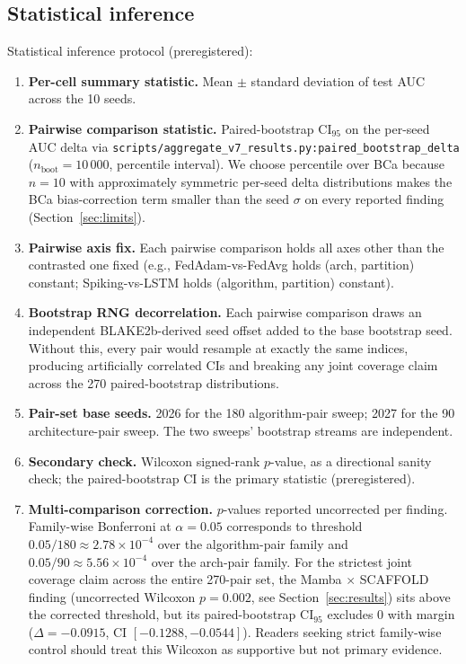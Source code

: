 \documentclass[journal]{IEEEtran}
\begin{document}
\subsection{Statistical inference}\label{sec:stats}

Statistical inference protocol (preregistered):

\begin{enumerate}
  \item \textbf{Per-cell summary statistic.} Mean $\pm$ standard deviation of test AUC across the 10 seeds.
  \item \textbf{Pairwise comparison statistic.} Paired-bootstrap CI$_{95}$ on the per-seed AUC delta via \lstinline|scripts/aggregate_v7_results.py:paired_bootstrap_delta| ($n_{\mathrm{boot}} = 10\,000$, percentile interval). We choose percentile over BCa because $n = 10$ with approximately symmetric per-seed delta distributions makes the BCa bias-correction term smaller than the seed $\sigma$ on every reported finding (Section~\ref{sec:limits}).
  \item \textbf{Pairwise axis fix.} Each pairwise comparison holds all axes other than the contrasted one fixed (e.g., FedAdam-vs-FedAvg holds (arch, partition) constant; Spiking-vs-LSTM holds (algorithm, partition) constant).
  \item \textbf{Bootstrap RNG decorrelation.} Each pairwise comparison draws an independent BLAKE2b-derived seed offset added to the base bootstrap seed. Without this, every pair would resample at exactly the same indices, producing artificially correlated CIs and breaking any joint coverage claim across the 270 paired-bootstrap distributions.
  \item \textbf{Pair-set base seeds.} 2026 for the 180 algorithm-pair sweep; 2027 for the 90 architecture-pair sweep. The two sweeps' bootstrap streams are independent.
  \item \textbf{Secondary check.} Wilcoxon signed-rank $p$-value, as a directional sanity check; the paired-bootstrap CI is the primary statistic (preregistered).
  \item \textbf{Multi-comparison correction.} $p$-values reported uncorrected per finding. Family-wise Bonferroni at $\alpha = 0.05$ corresponds to threshold $0.05 / 180 \approx 2.78 \times 10^{-4}$ over the algorithm-pair family and $0.05 / 90 \approx 5.56 \times 10^{-4}$ over the arch-pair family. For the strictest joint coverage claim across the entire 270-pair set, the Mamba $\times$ SCAFFOLD finding (uncorrected Wilcoxon $p = 0.002$, see Section~\ref{sec:results}) sits above the corrected threshold, but its paired-bootstrap CI$_{95}$ excludes 0 with margin ($\Delta = -0.0915$, CI $[-0.1288, -0.0544]$). Readers seeking strict family-wise control should treat this Wilcoxon as supportive but not primary evidence.
\end{enumerate}
\end{document}
